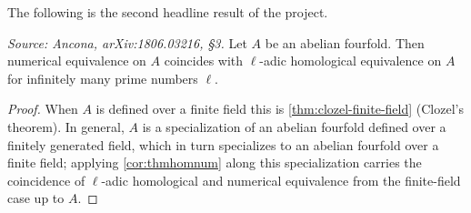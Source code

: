 The following is the second headline result of the project.

\begin{theorem}[Numerical \(=\) homological equivalence for abelian fourfolds]
  \label{thm:clozel}
  \textit{Source: Ancona, arXiv:1806.03216, §3.}
  Let \(A\) be an abelian fourfold. Then numerical equivalence on \(A\) coincides
  with \(\ell\)-adic homological equivalence on \(A\) for infinitely many prime
  numbers \(\ell\).
\end{theorem}

\begin{proof}
  When \(A\) is defined over a finite field this is \cref{thm:clozel-finite-field}
  (Clozel's theorem). In general, \(A\) is a specialization of an abelian fourfold
  defined over a finitely generated field, which in turn specializes to an abelian
  fourfold over a finite field; applying \cref{cor:thmhomnum} along this
  specialization carries the coincidence of \(\ell\)-adic homological and
  numerical equivalence from the finite-field case up to \(A\).
\end{proof}
